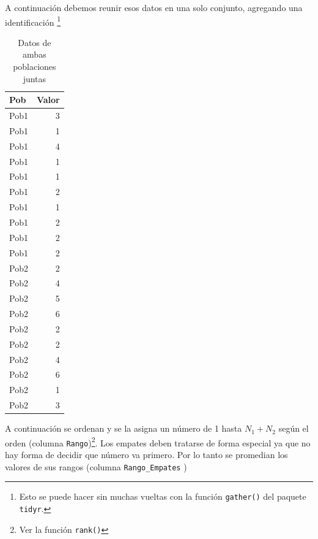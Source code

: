 \documentclass[]{book}
\newenvironment{Shaded}{\begin{snugshade}}{\end{snugshade}}
\newcommand{\DataTypeTok}[1]{\textcolor[rgb]{0.13,0.29,0.53}{#1}}
\newcommand{\KeywordTok}[1]{\textcolor[rgb]{0.13,0.29,0.53}{\textbf{#1}}}
\newcommand{\NormalTok}[1]{#1}
\newcommand{\OperatorTok}[1]{\textcolor[rgb]{0.81,0.36,0.00}{\textbf{#1}}}
\newcommand{\StringTok}[1]{\textcolor[rgb]{0.31,0.60,0.02}{#1}}
\let\rmarkdownfootnote\footnote%
\def\footnote{\protect\rmarkdownfootnote}
\theoremstyle{definition}
\theoremstyle{definition}
\theoremstyle{definition}
\theoremstyle{remark}
\begin{document}
A continuación debemos reunir esos datos en una solo conjunto, agregando
una identificación \footnote{Esto se puede hacer sin muchas vueltas con
  la función \texttt{gather()} del paquete \texttt{tidyr}.}

\begin{table}

\caption{\label{tab:ejemplo-ranking-gather}Datos de ambas poblaciones juntas}
\centering
\begin{tabular}[t]{l|r}
\hline
Pob & Valor\\
\hline
Pob1 & 3\\
\hline
Pob1 & 1\\
\hline
Pob1 & 4\\
\hline
Pob1 & 1\\
\hline
Pob1 & 1\\
\hline
Pob1 & 2\\
\hline
Pob1 & 1\\
\hline
Pob1 & 2\\
\hline
Pob1 & 2\\
\hline
Pob1 & 2\\
\hline
Pob2 & 2\\
\hline
Pob2 & 4\\
\hline
Pob2 & 5\\
\hline
Pob2 & 6\\
\hline
Pob2 & 2\\
\hline
Pob2 & 2\\
\hline
Pob2 & 4\\
\hline
Pob2 & 6\\
\hline
Pob2 & 1\\
\hline
Pob2 & 3\\
\hline
\end{tabular}
\end{table}

A continuación se ordenan y se la asigna un número de 1 hasta
\(N_1+N_2\) según el orden (columna \texttt{Rango})\footnote{Ver la
  función \texttt{rank()}}. Los empates deben tratarse de forma especial
ya que no hay forma de decidir que número va primero. Por lo tanto se
promedian los valores de sus rangos (columna \texttt{Rango\_Empates} )

\begin{Shaded}
\end{Shaded}
\end{document}
